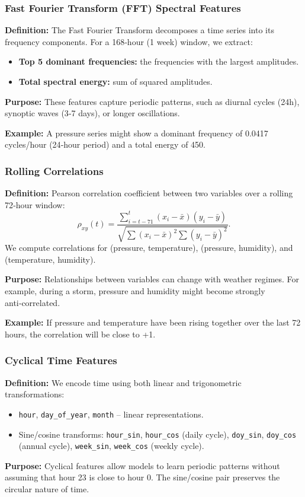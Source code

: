 \documentclass[12pt]{article}
\begin{document}
	\subsubsection{Fast Fourier Transform (FFT) Spectral Features}
	\textbf{Definition:} The Fast Fourier Transform decomposes a time series into its frequency components. For a 168‑hour (1 week) window, we extract:
	\begin{itemize}
		\item \textbf{Top 5 dominant frequencies:} the frequencies with the largest amplitudes.
		\item \textbf{Total spectral energy:} sum of squared amplitudes.
	\end{itemize}
	\textbf{Purpose:} These features capture periodic patterns, such as diurnal cycles (24h), synoptic waves (3‑7 days), or longer oscillations.
	
	\textbf{Example:} A pressure series might show a dominant frequency of 0.0417 cycles/hour (24‑hour period) and a total energy of 450.
	
	\subsubsection{Rolling Correlations}
	\textbf{Definition:} Pearson correlation coefficient between two variables over a rolling 72‑hour window:
	\[
	\rho_{xy}(t) = \frac{\sum_{i=t-71}^{t} (x_i-\bar{x})(y_i-\bar{y})}{\sqrt{\sum (x_i-\bar{x})^2\sum (y_i-\bar{y})^2}}.
	\]
	We compute correlations for (pressure, temperature), (pressure, humidity), and (temperature, humidity).
	
	\textbf{Purpose:} Relationships between variables can change with weather regimes. For example, during a storm, pressure and humidity might become strongly anti‑correlated.
	
	\textbf{Example:} If pressure and temperature have been rising together over the last 72 hours, the correlation will be close to +1.
	
	\subsubsection{Cyclical Time Features}
	\textbf{Definition:} We encode time using both linear and trigonometric transformations:
	\begin{itemize}
		\item \texttt{hour}, \texttt{day\_of\_year}, \texttt{month} – linear representations.
		\item Sine/cosine transforms: \texttt{hour\_sin}, \texttt{hour\_cos} (daily cycle), \texttt{doy\_sin}, \texttt{doy\_cos} (annual cycle), \texttt{week\_sin}, \texttt{week\_cos} (weekly cycle).
	\end{itemize}
	\textbf{Purpose:} Cyclical features allow models to learn periodic patterns without assuming that hour 23 is close to hour 0. The sine/cosine pair preserves the circular nature of time.
	
\end{document}
